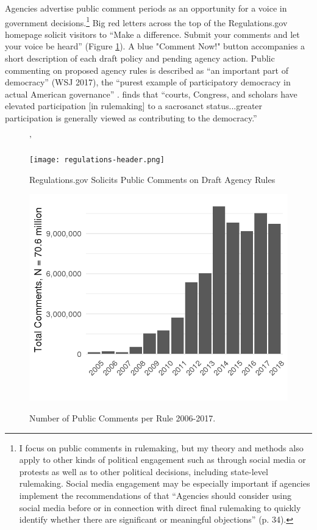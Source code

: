 Agencies advertise public comment periods as an opportunity for a voice in government decisions.\footnote{
I focus on public comments in rulemaking, but my theory and methods also apply to other kinds of political engagement such as through social media or protests as well as to other political decisions, including state-level rulemaking. Social media engagement may be especially important if agencies implement the recommendations of \citet{ACUS2018} that ``Agencies should consider using social media before or in connection with direct final rulemaking to quickly identify whether there are significant or meaningful objections'' (p. 34). 
} 
Big red letters across the top of the Regulations.gov homepage solicit visitors to ``Make a difference. Submit your comments and let your voice be heard'' (Figure \ref{fig:regs.gov}). A blue "Comment Now!" button accompanies a short description of each draft policy and pending agency action. 
Public commenting on proposed agency rules is described as ``an important part of democracy'' (WSJ 2017), the ``purest example of participatory democracy in actual American governance'' \citep{Herz2016}. \citet{Rossi1997} finds that ``courts, Congress, and scholars have elevated participation [in rulemaking] to a sacrosanct status...greater participation is generally viewed as contributing to the democracy.'' %

\begin{figure}'
    \centering
    \caption{Regulations.gov Solicits Public Comments on Draft Agency Rules}
    \label{fig:regs.gov}
    \texttt{[image: regulations-header.png]}
\end{figure}



\begin{figure}
\caption{Number of Public Comments per Rule 2006-2017.}
\centering
\includegraphics[width= 6.5in]{Figs/comments-per-year-1.png}
\label{fig:comments}
\end{figure}

